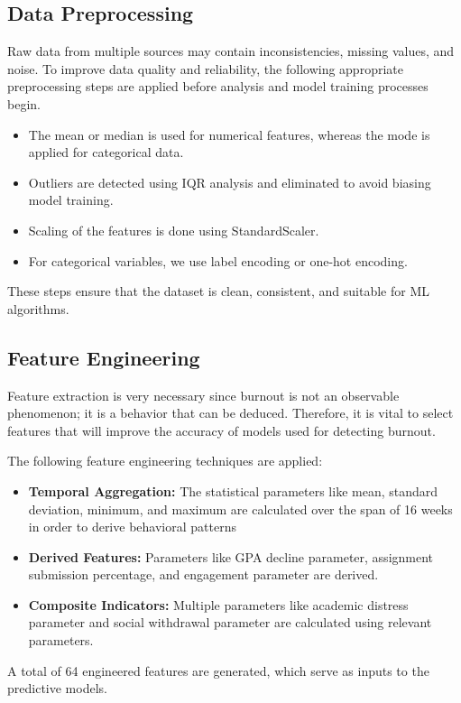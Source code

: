 \subsection{Data Preprocessing}

Raw data from multiple sources may contain inconsistencies, missing values, and noise. To improve data quality and reliability, the following appropriate preprocessing steps are applied before analysis and model training processes begin.

\begin{itemize}
    \item The mean or median is used for numerical features, whereas the mode is applied for categorical data.
    \item Outliers are detected using IQR analysis and eliminated to avoid biasing model training.
    \item Scaling of the features is done using StandardScaler.
    \item For categorical variables, we use label encoding or one-hot encoding.
\end{itemize}
These steps ensure that the dataset is clean, consistent, and suitable for ML algorithms.

\subsection{Feature Engineering}

Feature extraction is very necessary since burnout is not an observable phenomenon; it is a behavior that can be deduced. Therefore, it is vital to select features that will improve the accuracy of models used for detecting burnout.

The following feature engineering techniques are applied:

\begin{itemize}
    \item \textbf{Temporal Aggregation:} The statistical parameters like mean, standard deviation, minimum, and maximum are calculated over the span of 16 weeks in order to derive behavioral patterns
    \item \textbf{Derived Features:} Parameters like GPA decline parameter, assignment submission percentage, and engagement parameter are derived.
    \item \textbf{Composite Indicators:} Multiple parameters like academic distress parameter and social withdrawal parameter are calculated using relevant parameters.
\end{itemize}
A total of 64 engineered features are generated, which serve as inputs to the predictive models.

